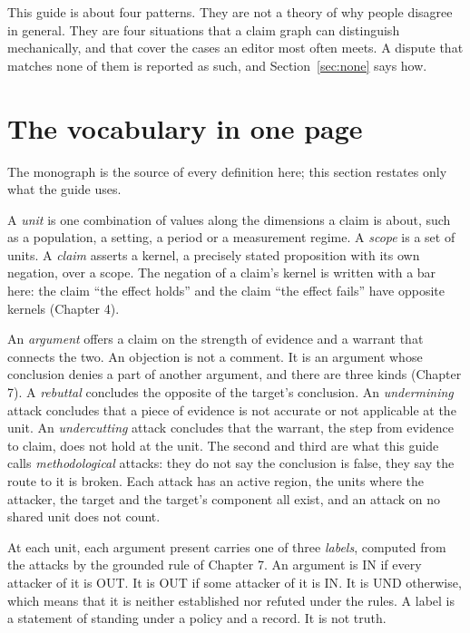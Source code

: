 \documentclass[11pt]{article}
\newcommand{\IN}{\textsf{IN}}
\newcommand{\UND}{\textsf{UND}}
\newcommand{\OUT}{\textsf{OUT}}
\begin{document}
This guide is about four patterns. They are not a theory of why people disagree in general. They are four situations that a claim graph can distinguish mechanically, and that cover the cases an editor most often meets. A dispute that matches none of them is reported as such, and Section~\ref{sec:none} says how.

\section{The vocabulary in one page}\label{sec:vocab}

The monograph is the source of every definition here; this section restates only what the guide uses.

A \emph{unit} is one combination of values along the dimensions a claim is about, such as a population, a setting, a period or a measurement regime. A \emph{scope} is a set of units. A \emph{claim} asserts a kernel, a precisely stated proposition with its own negation, over a scope. The negation of a claim's kernel is written with a bar here: the claim ``the effect holds'' and the claim ``the effect fails'' have opposite kernels (Chapter 4).

An \emph{argument} offers a claim on the strength of evidence and a warrant that connects the two. An objection is not a comment. It is an argument whose conclusion denies a part of another argument, and there are three kinds (Chapter 7). A \emph{rebuttal} concludes the opposite of the target's conclusion. An \emph{undermining} attack concludes that a piece of evidence is not accurate or not applicable at the unit. An \emph{undercutting} attack concludes that the warrant, the step from evidence to claim, does not hold at the unit. The second and third are what this guide calls \emph{methodological} attacks: they do not say the conclusion is false, they say the route to it is broken. Each attack has an active region, the units where the attacker, the target and the target's component all exist, and an attack on no shared unit does not count.

At each unit, each argument present carries one of three \emph{labels}, computed from the attacks by the grounded rule of Chapter 7. An argument is \IN{} if every attacker of it is \OUT{}. It is \OUT{} if some attacker of it is \IN{}. It is \UND{} otherwise, which means that it is neither established nor refuted under the rules. A label is a statement of standing under a policy and a record. It is not truth.
\end{document}
